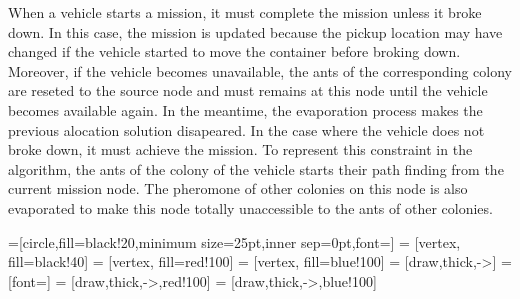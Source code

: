 \documentclass[a4paper,10pt]{article}
\begin{document}
When a vehicle starts a mission, it must complete the mission unless it broke down. In this case, the mission is updated because the pickup location may have changed if the vehicle started to move the container before broking down. Moreover, if the vehicle becomes unavailable, the ants of the corresponding colony are reseted to the source node and must remains at this node until the vehicle becomes available again. In the meantime, the evaporation process makes the previous alocation solution disapeared.
In the case where the vehicle does not broke down, it must achieve the mission. To represent this constraint in the algorithm, the ants of the colony of the vehicle starts their path finding from the current mission node. The pheromone of other colonies on this node is also evaporated to make this node totally unaccessible to the ants of other colonies.


=[circle,fill=black!20,minimum size=25pt,inner sep=0pt,font=\tiny]
 = [vertex, fill=black!40]
 = [vertex, fill=red!100]
 = [vertex, fill=blue!100]
 = [draw,thick,->]
 = [font=\small]
 = [draw,thick,->,red!100]
 = [draw,thick,->,blue!100]
\end{document}
